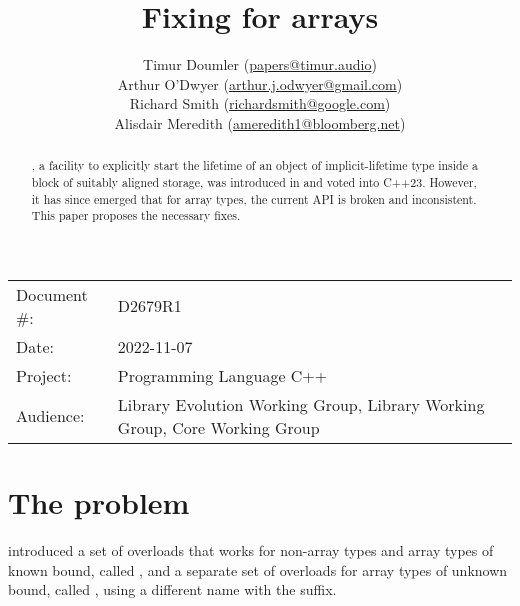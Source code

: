 
\usepackage{listings}

\newcommand{\forceindent}{\parindent=1em\indent\parindent=0pt\relax} %


\title{Fixing  for arrays}
\author{
  Timur Doumler \small(\href{mailto:papers@timur.audio}{papers@timur.audio}) \\
  Arthur O'Dwyer \small(\href{mailto:arthur.j.odwyer@gmail.com}{arthur.j.odwyer@gmail.com}) \\
  Richard Smith \small(\href{mailto:richardsmith@google.com}{richardsmith@google.com}) \\
  Alisdair Meredith \small(\href{mailto:ameredith1@bloomberg.net}{ameredith1@bloomberg.net})
}
\date{}
\maketitle

\begin{tabular}{ll}
Document \#: & D2679R1 \\
Date: & 2022-11-07\\
Project: & Programming Language C++ \\
Audience: & Library Evolution Working Group, Library Working Group, Core Working Group
\end{tabular}


\begin{abstract}
, a facility to explicitly start the lifetime of an object of implicit-lifetime type inside a block of suitably aligned storage, was introduced in \cite{P2590R2} and voted into C++23. However, it has since emerged that for array types, the current API is broken and inconsistent. This paper proposes the necessary fixes.
\end{abstract}

\section{The problem}
\label{sec:problem}

\cite{P2590R2} introduced a set of overloads that works for non-array types and array types of known bound, called , and a separate set of overloads for array types of unknown bound, called  , using a different name with the  suffix.

